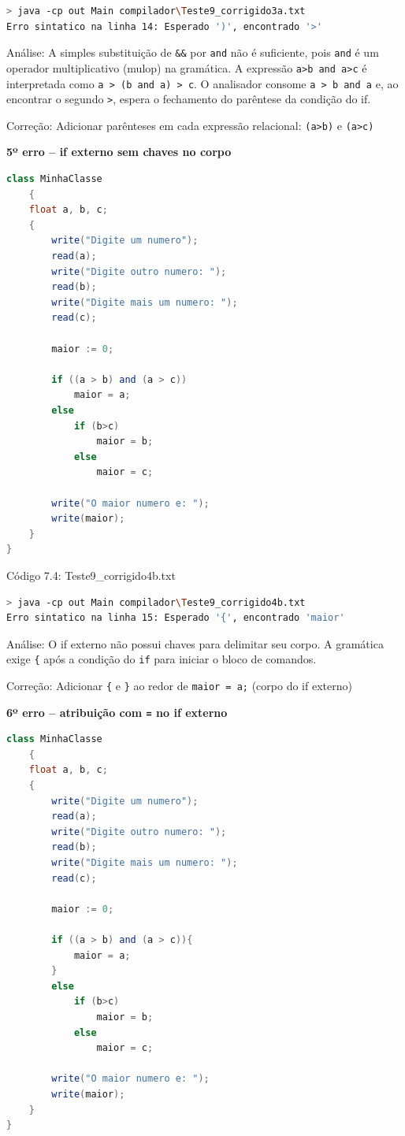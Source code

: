 \documentclass[12pt,a4paper]{article}
\begin{document}
\begin{lstlisting}[language=bash]
> java -cp out Main compilador\Teste9_corrigido3a.txt
Erro sintatico na linha 14: Esperado ')', encontrado '>'
\end{lstlisting}

Análise: A simples substitui\c{c}\~ao de \texttt{\&\&} por \texttt{and} n\~ao \'e suficiente, pois \texttt{and} \'e um operador multiplicativo (mulop) na gram\'atica. A express\~ao \texttt{a>b and a>c} \'e interpretada como \texttt{a > (b and a) > c}. O analisador consome \texttt{a > b and a} e, ao encontrar o segundo \texttt{>}, espera o fechamento do par\^entese da condi\c{c}\~ao do if.

Correção: Adicionar par\^enteses em cada express\~ao relacional: \texttt{(a>b)} e \texttt{(a>c)}

\textbf{5º erro -- if externo sem chaves no corpo}

\begin{lstlisting}[language=Java]
class MinhaClasse
    {
    float a, b, c;
    {
        write("Digite um numero");
        read(a);
        write("Digite outro numero: ");
        read(b);
        write("Digite mais um numero: ");
        read(c);

        maior := 0;

        if ((a > b) and (a > c))
            maior = a;
        else
            if (b>c)
                maior = b;
            else
                maior = c;

        write("O maior numero e: ");
        write(maior);
    }
}
\end{lstlisting}

Código 7.4: Teste9\_corrigido4b.txt

\begin{lstlisting}[language=bash]
> java -cp out Main compilador\Teste9_corrigido4b.txt
Erro sintatico na linha 15: Esperado '{', encontrado 'maior'
\end{lstlisting}


Análise: O if externo n\~ao possui chaves para delimitar seu corpo. A gram\'atica exige \texttt{\{} ap\'os a condi\c{c}\~ao do \texttt{if} para iniciar o bloco de comandos.

Corre\c{c}\~ao: Adicionar \texttt{\{} e \texttt{\}} ao redor de \texttt{maior = a;} (corpo do if externo)

\textbf{6º erro -- atribuição com \texttt{=} no if externo}

\begin{lstlisting}[language=Java]
class MinhaClasse
    {
    float a, b, c;
    {
        write("Digite um numero");
        read(a);
        write("Digite outro numero: ");
        read(b);
        write("Digite mais um numero: ");
        read(c);

        maior := 0;

        if ((a > b) and (a > c)){
            maior = a;
        }
        else
            if (b>c)
                maior = b;
            else
                maior = c;

        write("O maior numero e: ");
        write(maior);
    }
}
\end{lstlisting}
\end{document}
